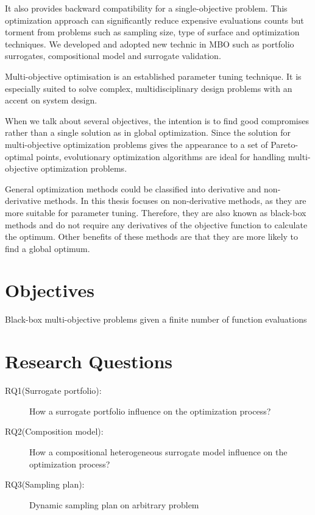     It also provides backward compatibility for a single-objective problem. This optimization approach can significantly reduce expensive evaluations counts but torment from problems such as sampling size, type of surface and optimization techniques. We developed and adopted new technic in MBO such as portfolio surrogates, compositional model and surrogate validation. 

    Multi-objective optimisation is an established parameter tuning technique. It is especially suited to solve complex, multidisciplinary design problems with an accent on system design.

    When we talk about several objectives, the intention is to find good compromises rather than a single solution as in global optimization.
    Since the solution for multi-objective optimization problems gives the appearance to a set of Pareto-optimal points, evolutionary optimization algorithms are ideal for handling multi-objective optimization problems.

    General optimization methods could be classified into derivative and non-derivative methods. In this thesis focuses on non-derivative methods, as they are more suitable for parameter tuning. Therefore, they are also known as black-box methods and do not require any derivatives of the objective function to calculate the optimum.  Other benefits of these methods are that they are more likely to find a global optimum. 


\section{Objectives}
    Black-box multi-objective problems given a finite number of function evaluations

\section{Research Questions}
\begin{description}
    \item[RQ1(Surrogate portfolio):]\label{RQ1} How a surrogate portfolio influence on the optimization process?
    \item[RQ2(Composition model):]\label{RQ2} How a compositional heterogeneous surrogate model influence on the optimization process?
    \item[RQ3(Sampling plan):]\label{RQ3} Dynamic sampling plan on arbitrary problem
\end{description}

